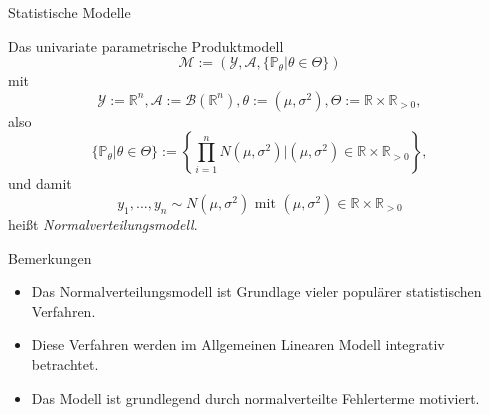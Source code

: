 \documentclass[
  8pt,
  ignorenonframetext,
]{beamer}
\providecommand{\tightlist}{%
  \setlength{\itemsep}{0pt}\setlength{\parskip}{0pt}}
\begin{document}
\begin{frame}{Statistische Modelle}
\protect\hypertarget{statistische-modelle-2}{}
\footnotesize
\begin{definition}[Normalverteilungsmodell]
Das univariate parametrische Produktmodell
\begin{equation}
\mathcal{M} := \left(\mathcal{Y}, \mathcal{A}, \{\mathbb{P}_\theta|\theta \in \Theta\}\right)
\end{equation}
mit
\begin{equation}
\mathcal{Y} := \mathbb{R}^n, \mathcal{A} := \mathcal{B}(\mathbb{R}^n), \theta := (\mu, \sigma^2), \Theta := \mathbb{R} \times \mathbb{R}_{>0},
\end{equation}
also
\begin{equation}
\{\mathbb{P}_\theta|\theta \in \Theta\}
:= \left\lbrace \prod_{i=1}^n N(\mu,\sigma^2)|(\mu,\sigma^2)\in \mathbb{R} \times \mathbb{R}_{>0} \right\rbrace,
\end{equation}
und damit
\begin{equation}
y_1,...,y_n \sim N(\mu,\sigma^2) \mbox{ mit } (\mu,\sigma^2)\in \mathbb{R} \times \mathbb{R}_{>0}
\end{equation}
heißt \textit{Normalverteilungsmodell}.
\end{definition}
\footnotesize

Bemerkungen

\begin{itemize}
\tightlist
\item
  \justifying Das Normalverteilungsmodell ist Grundlage vieler populärer
  statistischen Verfahren.
\item
  Diese Verfahren werden im Allgemeinen Linearen Modell integrativ
  betrachtet.
\item
  Das Modell ist grundlegend durch normalverteilte Fehlerterme
  motiviert.
\end{itemize}
\end{frame}
\end{document}
